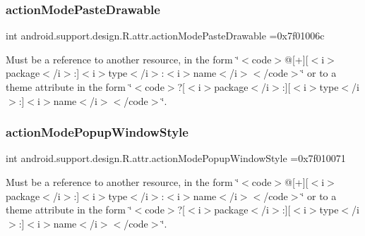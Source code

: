 \subsubsection{\texorpdfstring{action\+Mode\+Paste\+Drawable}{actionModePasteDrawable}}
{\footnotesize\ttfamily int android.\+support.\+design.\+R.\+attr.\+action\+Mode\+Paste\+Drawable =0x7f01006c\hspace{0.3cm}{\ttfamily [static]}}

Must be a reference to another resource, in the form \char`\"{}$<$code$>$@\mbox{[}+\mbox{]}\mbox{[}$<$i$>$package$<$/i$>$\+:\mbox{]}$<$i$>$type$<$/i$>$\+:$<$i$>$name$<$/i$>$$<$/code$>$\char`\"{} or to a theme attribute in the form \char`\"{}$<$code$>$?\mbox{[}$<$i$>$package$<$/i$>$\+:\mbox{]}\mbox{[}$<$i$>$type$<$/i$>$\+:\mbox{]}$<$i$>$name$<$/i$>$$<$/code$>$\char`\"{}. \mbox{\label{classandroid_1_1support_1_1design_1_1R_1_1attr_a3d81e37de48707c92845af1664325cc2}} 
\subsubsection{\texorpdfstring{action\+Mode\+Popup\+Window\+Style}{actionModePopupWindowStyle}}
{\footnotesize\ttfamily int android.\+support.\+design.\+R.\+attr.\+action\+Mode\+Popup\+Window\+Style =0x7f010071\hspace{0.3cm}{\ttfamily [static]}}

Must be a reference to another resource, in the form \char`\"{}$<$code$>$@\mbox{[}+\mbox{]}\mbox{[}$<$i$>$package$<$/i$>$\+:\mbox{]}$<$i$>$type$<$/i$>$\+:$<$i$>$name$<$/i$>$$<$/code$>$\char`\"{} or to a theme attribute in the form \char`\"{}$<$code$>$?\mbox{[}$<$i$>$package$<$/i$>$\+:\mbox{]}\mbox{[}$<$i$>$type$<$/i$>$\+:\mbox{]}$<$i$>$name$<$/i$>$$<$/code$>$\char`\"{}. \mbox{\label{classandroid_1_1support_1_1design_1_1R_1_1attr_afd0f5aed05e8bb00730e84fb8bd500de}} 

